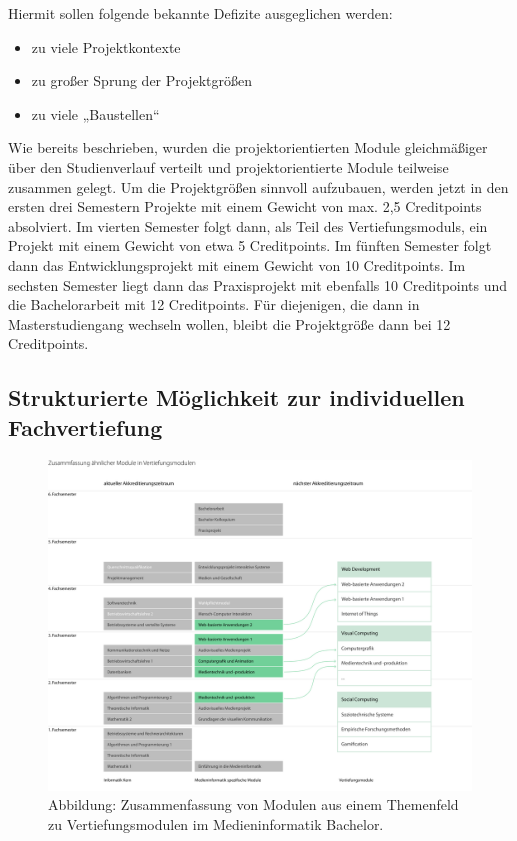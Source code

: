 Hiermit sollen folgende bekannte Defizite ausgeglichen werden:

\begin{itemize}
\tightlist
\item
  zu viele Projektkontexte
\item
  zu großer Sprung der Projektgrößen
\item
  zu viele „Baustellen``
\end{itemize}

Wie bereits beschrieben, wurden die projektorientierten Module
gleichmäßiger über den Studienverlauf verteilt und projektorientierte
Module teilweise zusammen gelegt. Um die Projektgrößen sinnvoll
aufzubauen, werden jetzt in den ersten drei Semestern Projekte mit einem
Gewicht von max. 2,5 Creditpoints absolviert. Im vierten Semester folgt
dann, als Teil des Vertiefungsmoduls, ein Projekt mit einem Gewicht von
etwa 5 Creditpoints. Im fünften Semester folgt dann das
Entwicklungsprojekt mit einem Gewicht von 10 Creditpoints. Im sechsten
Semester liegt dann das Praxisprojekt mit ebenfalls 10 Creditpoints und
die Bachelorarbeit mit 12 Creditpoints. Für diejenigen, die dann in
Masterstudiengang wechseln wollen, bleibt die Projektgröße dann bei 12
Creditpoints.

\subsection{Strukturierte Möglichkeit zur individuellen
Fachvertiefung}\label{strukturierte-muxf6glichkeit-zur-individuellen-fachvertiefung}

\begin{figure}[htbp]
\centering
\includegraphics[width=\columnwidth]{../anhaenge/bilder/ba-vertiefungen.png}
\caption{Abbildung: Zusammenfassung von Modulen aus einem Themenfeld zu
Vertiefungsmodulen im Medieninformatik Bachelor.}
\end{figure}

